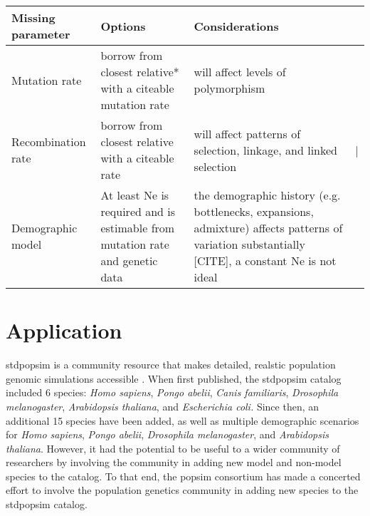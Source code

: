 \documentclass[hidelinks]{article}
\begin{document}
\begin{table}[]
     \label{tab:title} 
    \begin{tabular}{@{}llll@{}}
    \toprule
    Missing parameter                        & Options                                                                          & Considerations                                                                                                                                       &   \\ \midrule
    \multicolumn{1}{|l|}{Mutation rate}      & \multicolumn{1}{l|}{borrow from closest relative* with a citeable mutation rate} & \multicolumn{1}{l|}{will affect levels of polymorphism}                                                                                              &   \\ \cmidrule(r){1-3}
    \multicolumn{1}{|l|}{Recombination rate} & \multicolumn{1}{l|}{borrow from closest relative with a citeable rate}           & \multicolumn{1}{l|}{will affect patterns of selection, linkage, and linked selection}                                                                & | \\ \cmidrule(r){1-3}
    Demographic model                        & At least Ne is required and is estimable from mutation rate and genetic data     & the demographic history (e.g. bottlenecks, expansions, admixture) affects patterns of variation substantially {[}CITE{]}, a constant Ne is not ideal &   \\ \bottomrule
    \end{tabular}
\end{table}

\hypertarget{application}{%
\section*{Application}\label{application}}

stdpopsim is a community resource that makes detailed, realstic
population genomic simulations accessible \citep{Adrion2020}. When first
published, the stdpopsim catalog included 6 species: \emph{Homo
sapiens}, \emph{Pongo abelii}, \emph{Canis familiaris}, \emph{Drosophila
melanogaster}, \emph{Arabidopsis thaliana}, and \emph{Escherichia coli.}
Since then, an additional 15 species have been added,
as well as multiple demographic scenarios for \emph{Homo sapiens},
\emph{Pongo abelii}, \emph{Drosophila melanogaster}, and
\emph{Arabidopsis thaliana}. However, it had the potential to be
useful to a wider community of researchers by involving the community
in adding new model and non-model species to the catalog.
To that end, the popsim consortium has made a concerted effort to 
involve the population genetics community in adding new species 
to the stdpopsim catalog.
\end{document}
